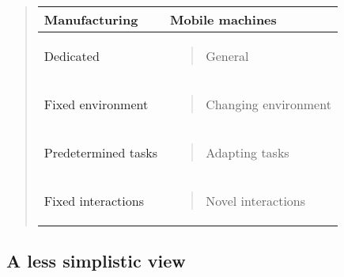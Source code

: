 \begin{quote}
\begin{longtable}[]{@{}ll@{}}
\toprule
\begin{minipage}[b]{0.27\columnwidth}\raggedright
Manufacturing\strut
\end{minipage} & \begin{minipage}[b]{0.33\columnwidth}\raggedright
Mobile machines\strut
\end{minipage}\tabularnewline
\midrule
\endhead
\begin{minipage}[t]{0.27\columnwidth}\raggedright
Dedicated\strut
\end{minipage} & \begin{minipage}[t]{0.33\columnwidth}\raggedright
\begin{quote}
General
\end{quote}\strut
\end{minipage}\tabularnewline
\begin{minipage}[t]{0.27\columnwidth}\raggedright
Fixed environment\strut
\end{minipage} & \begin{minipage}[t]{0.33\columnwidth}\raggedright
\begin{quote}
Changing environment
\end{quote}\strut
\end{minipage}\tabularnewline
\begin{minipage}[t]{0.27\columnwidth}\raggedright
Predetermined tasks\strut
\end{minipage} & \begin{minipage}[t]{0.33\columnwidth}\raggedright
\begin{quote}
Adapting tasks
\end{quote}\strut
\end{minipage}\tabularnewline
\begin{minipage}[t]{0.27\columnwidth}\raggedright
Fixed interactions\strut
\end{minipage} & \begin{minipage}[t]{0.33\columnwidth}\raggedright
\begin{quote}
Novel interactions
\end{quote}\strut
\end{minipage}\tabularnewline
\bottomrule
\end{longtable}
\end{quote}

\hypertarget{a-less-simplistic-view}{%
\subsection{A less simplistic view}\label{a-less-simplistic-view}}


